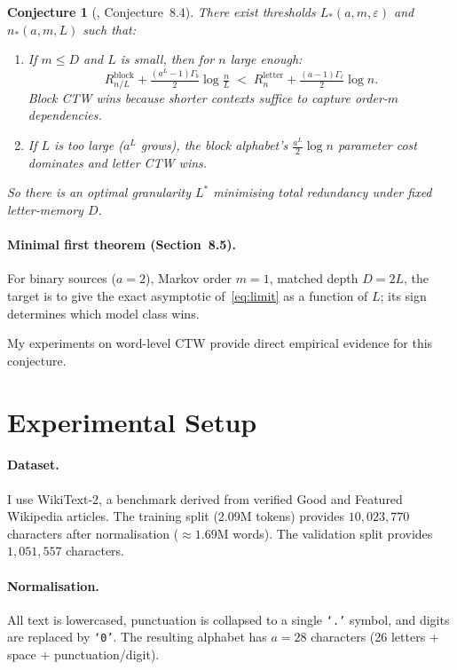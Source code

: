 \documentclass[11pt,a4paper]{article}
\newtheorem{conjecture}{Conjecture}
\begin{document}
\begin{conjecture}[\citealt{Willems2026}, Conjecture~8.4]
\label{conj:sec8}
There exist thresholds $L_*(a,m,\varepsilon)$ and $n_*(a,m,L)$ such that:
\begin{enumerate}
  \item If $m \le D$ and $L$ is small, then for $n$ large enough:
    \begin{equation*}
      R_{n/L}^{\mathrm{block}} + \tfrac{(a^L-1)\Gamma_b}{2}\log\tfrac{n}{L}
      \;<\;
      R_n^{\mathrm{letter}} + \tfrac{(a-1)\Gamma_\ell}{2}\log n.
    \end{equation*}
    Block CTW wins because shorter contexts suffice to capture
    order-$m$ dependencies.
  \item If $L$ is too large ($a^L$ grows), the block alphabet's
    $\frac{a^L}{2}\log n$ parameter cost dominates and letter CTW wins.
\end{enumerate}
So there is an optimal granularity $L^*$ minimising total redundancy
under fixed letter-memory $D$.
\end{conjecture}

\paragraph{Minimal first theorem (Section~8.5).}
For binary sources ($a = 2$), Markov order $m = 1$, matched depth $D = 2L$,
the target is to give the exact asymptotic of~\eqref{eq:limit}
as a function of $L$; its sign determines which model class wins.

My experiments on word-level CTW provide direct empirical evidence
for this conjecture.

\section{Experimental Setup}
\label{sec:setup}

\paragraph{Dataset.}
I use WikiText-2, a benchmark derived from verified Good and Featured
Wikipedia articles.
The training split (2.09M tokens) provides $10{,}023{,}770$ characters
after normalisation ($\approx 1.69$M words).
The validation split provides $1{,}051{,}557$ characters.

\paragraph{Normalisation.}
All text is lowercased, punctuation is collapsed to a single \texttt{`.'} symbol,
and digits are replaced by \texttt{`0'}.
The resulting alphabet has $a = 28$ characters
(26 letters + space + punctuation/digit).
\end{document}

